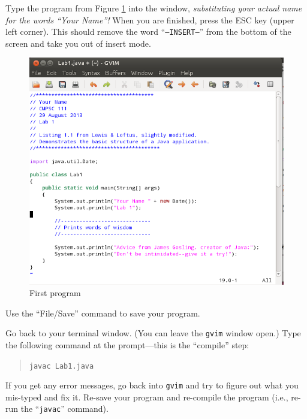        Type the program from Figure
       \ref{lab1prog} into the window, {\em substituting your actual name for the words
         ``Your Name''!} When you are finished, press the ESC key (upper left corner).
       This should remove the word ``{\tt --INSERT--}'' from the bottom of the screen 
       and take you out of insert mode.

       \begin{figure}[htbp]
         \centering
         \includegraphics[width=5.8in]{images/lab1prog}
         \caption{First program}
         \label{lab1prog}
       \end{figure}

       Use the ``File/Save'' command to save your program.

       Go back to your terminal window. (You can leave the {\tt gvim} window open.)
       Type the following command at the
       prompt---this is the ``compile'' step:
       \begin{quote}
         \verb$javac Lab1.java$
       \end{quote}
       If you get any error messages, go back into {\tt gvim} and try to figure 
       out what you mis-typed and fix it. Re-save your program  and 
       re-compile the program (i.e., re-run the ``{\tt javac}'' command).

